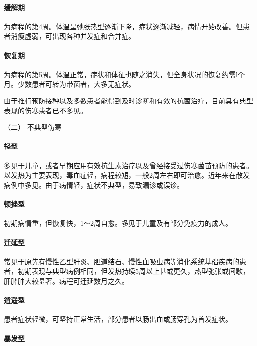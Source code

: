\paragraph{缓解期}

为病程的第4周。体温呈弛张热型逐渐下降，症状逐渐减轻，病情开始改善。但患者消瘦虚弱，可出现各种并发症和合并症。

\paragraph{恢复期}

为病程的第5周。体温正常，症状和体征也随之消失，但全身状况的恢复约需l个月。少数患者可转为带菌者，大多无症状。

由于推行预防接种以及多数患者能得到及时诊断和有效的抗菌治疗，目前具有典型表现的伤寒患者已不多见。

\hypertarget{text00225.htmlux5cux23CHP7-8-2-1-2}{}
（二） 不典型伤寒

\paragraph{轻型}

多见于儿童，或者早期应用有效抗生素治疗以及曾经接受过伤寒菌苗预防的患者。以发热为主要表现，毒血症轻，病程较短，一般2周左右即可治愈。近年来在散发病例中多见。由于病情轻，症状不典型，易致漏诊或误诊。

\paragraph{顿挫型}

初期病情重，但恢复快，1～2周自愈。多见于儿童及有部分免疫力的成人。

\paragraph{迁延型}

常见于原先有慢性乙型肝炎、胆道结石、慢性血吸虫病等消化系统基础疾病的患者，初期表现与典型病例相同，但发热持续5周以上甚或更久，热型弛张或间歇，肝脾肿大较显著。病程可迁延数月之久。

\paragraph{逍遥型}

患者症状轻微，可坚持正常生活，部分患者以肠出血或肠穿孔为首发症状。

\paragraph{暴发型}

